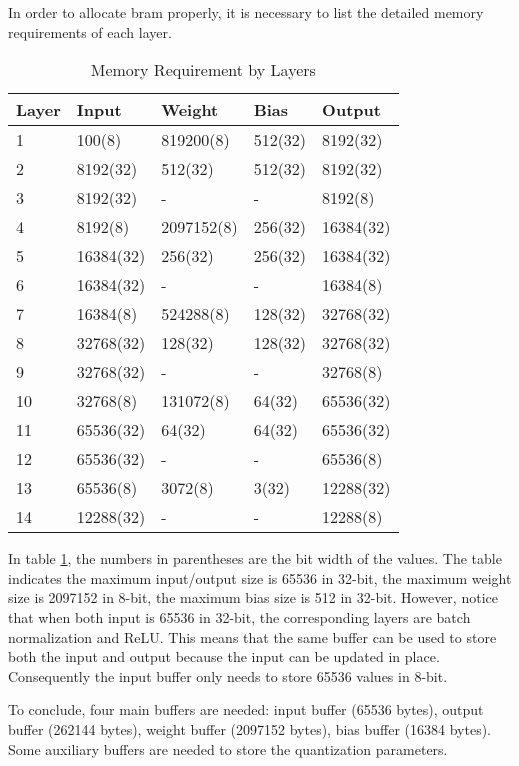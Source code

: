 In order to allocate \gls{bram} properly, it is necessary to list the detailed memory requirements of each
layer.

\begin{table}[h]
  \centering
  \caption{Memory Requirement by Layers}
  \begin{tabular}{l | l | l | l | l}
    \toprule
    Layer & Input & Weight & Bias & Output \\
    \midrule
    1 & 100(8) & 819200(8) & 512(32) & 8192(32) \\
    2 & 8192(32) & 512(32) & 512(32) & 8192(32) \\
    3 & 8192(32) & - & - & 8192(8) \\
    4 & 8192(8) & 2097152(8) & 256(32) & 16384(32) \\
    5 & 16384(32) & 256(32) & 256(32) & 16384(32) \\
    6 & 16384(32) & - & - & 16384(8) \\
    7 & 16384(8) & 524288(8) & 128(32) & 32768(32) \\
    8 & 32768(32) & 128(32) & 128(32) & 32768(32) \\
    9 & 32768(32) & - & - & 32768(8) \\
    10 & 32768(8) & 131072(8) & 64(32) & 65536(32) \\
    11 & 65536(32) & 64(32) & 64(32) & 65536(32) \\
    12 & 65536(32) & - & - & 65536(8) \\
    13 & 65536(8) & 3072(8) & 3(32) & 12288(32) \\
    14 & 12288(32) & - & - & 12288(8) \\
    \bottomrule
  \end{tabular}
  \label{table:memory_requirements}
\end{table}

In table \ref{table:memory_requirements}, the numbers in parentheses are the bit width of the values. The table
indicates the maximum input/output size is 65536 in 32-bit, the maximum weight size is 2097152 in 8-bit, the
maximum bias size is 512 in 32-bit. However, notice that when both input is 65536 in 32-bit, the corresponding
layers are batch normalization and ReLU. This means that the same buffer can be used to store both the
input and output because the input can be updated in place. Consequently the input buffer only needs to
store 65536 values in 8-bit.

To conclude, four main buffers are needed: input buffer (65536 bytes), output buffer (262144 bytes),
weight buffer (2097152 bytes), bias buffer (16384 bytes). Some auxiliary buffers are needed to store
the quantization parameters.

